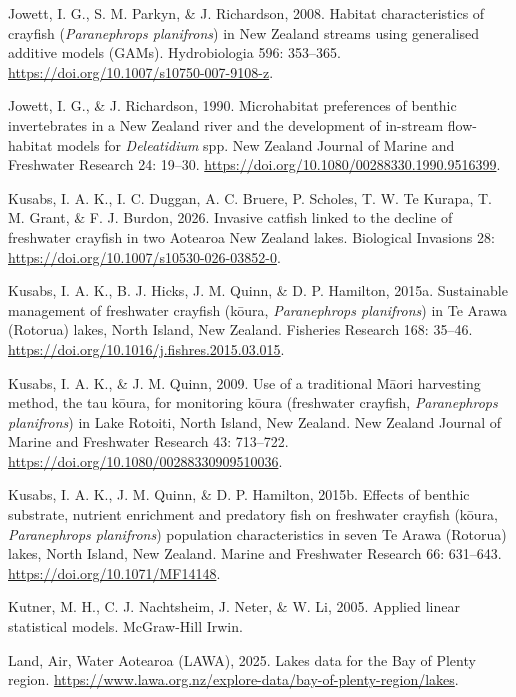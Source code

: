 \documentclass[
  letterpaper,
  DIV=11,
  numbers=noendperiod]{scrartcl}
\newlength{\cslhangindent}
\newenvironment{CSLReferences}[2] %
 {\begin{list}{}{%
  \setlength{\itemindent}{0pt}
  \setlength{\leftmargin}{0pt}
  \setlength{\parsep}{0pt}
  \ifodd #1
   \setlength{\leftmargin}{\cslhangindent}
   \setlength{\itemindent}{-1\cslhangindent}
  \fi
  \setlength{\itemsep}{#2\baselineskip}}}
 {\end{list}}
\begin{document}
\begin{CSLReferences}{0}{1}
Jowett, I. G., S. M. Parkyn, \& J. Richardson, 2008. Habitat
characteristics of crayfish ({\emph{Paranephrops planifrons}}) in {New
Zealand} streams using generalised additive models ({GAMs}).
Hydrobiologia 596: 353--365.
\url{https://doi.org/10.1007/s10750-007-9108-z}.

Jowett, I. G., \& J. Richardson, 1990. Microhabitat preferences of
benthic invertebrates in a {New Zealand} river and the development of
in-stream flow-habitat models for {\emph{Deleatidium}} spp. New Zealand
Journal of Marine and Freshwater Research 24: 19--30.
\url{https://doi.org/10.1080/00288330.1990.9516399}.

Kusabs, I. A. K., I. C. Duggan, A. C. Bruere, P. Scholes, T. W. Te
Kurapa, T. M. Grant, \& F. J. Burdon, 2026. Invasive catfish linked to
the decline of freshwater crayfish in two {Aotearoa New Zealand} lakes.
Biological Invasions 28:
\url{https://doi.org/10.1007/s10530-026-03852-0}.

Kusabs, I. A. K., B. J. Hicks, J. M. Quinn, \& D. P. Hamilton, 2015a.
Sustainable management of freshwater crayfish (k{ō}ura,
{\emph{Paranephrops planifrons}}) in {Te Arawa} ({Rotorua}) lakes,
{North Island, New Zealand}. Fisheries Research 168: 35--46.
\url{https://doi.org/10.1016/j.fishres.2015.03.015}.

Kusabs, I. A. K., \& J. M. Quinn, 2009. Use of a traditional {Māori}
harvesting method, the tau k{ō}ura, for monitoring k{ō}ura (freshwater
crayfish, {\emph{Paranephrops planifrons}}) in {Lake Rotoiti}, {North
Island, New Zealand}. New Zealand Journal of Marine and Freshwater
Research 43: 713--722. \url{https://doi.org/10.1080/00288330909510036}.

Kusabs, I. A. K., J. M. Quinn, \& D. P. Hamilton, 2015b. Effects of
benthic substrate, nutrient enrichment and predatory fish on freshwater
crayfish (k{ō}ura, {\emph{Paranephrops planifrons}}) population
characteristics in seven {Te Arawa} ({Rotorua}) lakes, {North Island,
New Zealand}. Marine and Freshwater Research 66: 631--643.
\url{https://doi.org/10.1071/MF14148}.

Kutner, M. H., C. J. Nachtsheim, J. Neter, \& W. Li, 2005. Applied
linear statistical models. McGraw-Hill Irwin.

Land, Air, Water Aotearoa (LAWA), 2025. Lakes data for the {Bay of
Plenty} region.
\url{https://www.lawa.org.nz/explore-data/bay-of-plenty-region/lakes}.


\end{CSLReferences}
\end{document}

